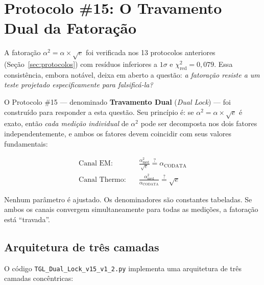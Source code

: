 \documentclass[12pt,a4paper,twoside]{article}
\newcommand{\alphaii}{\alpha^{2}}
\newcommand{\code}[1]{\texttt{#1}}
\begin{document}

\section{Protocolo \#15: O Travamento Dual da Fatoração}
\label{sec:protocolo15}

A fatoração $\alphaii = \alpha \times \sqrt{e}$ foi verificada nos 13 protocolos anteriores (Seção~\ref{sec:protocolos}) com resíduos inferiores a $1\sigma$ e $\chi^2_{\text{red}} = 0{,}079$. Essa consistência, embora notável, deixa em aberto a questão: \textit{a fatoração resiste a um teste projetado especificamente para falsificá-la?}

O Protocolo \#15 \cite{Miguel2026Protocol15} --- denominado \textbf{Travamento Dual} (\textit{Dual Lock}) --- foi construído para responder a esta questão. Seu princípio é: se $\alphaii = \alpha \times \sqrt{e}$ é exato, então \textit{cada medição individual} de $\alphaii$ pode ser decomposta nos dois fatores independentemente, e ambos os fatores devem coincidir com seus valores fundamentais:
%
\begin{equationbox}[title={O Travamento Dual}]
\begin{align}
\text{Canal EM:} \quad & \frac{\alphaii_{\text{med}}}{\sqrt{e}} \stackrel{?}{=} \alpha_{\text{CODATA}} \label{eq:canal_em} \\[6pt]
\text{Canal Thermo:} \quad & \frac{\alphaii_{\text{med}}}{\alpha_{\text{CODATA}}} \stackrel{?}{=} \sqrt{e} \label{eq:canal_thermo}
\end{align}
\end{equationbox}
%
Nenhum parâmetro é ajustado. Os denominadores são constantes tabeladas. Se ambos os canais convergem simultaneamente para todas as medições, a fatoração está ``travada''.


\subsection{Arquitetura de três camadas}

O código \code{TGL\_Dual\_Lock\_v15\_v1\_2.py} \cite{Miguel2026Protocol15} implementa uma arquitetura de três camadas concêntricas:
\end{document}
